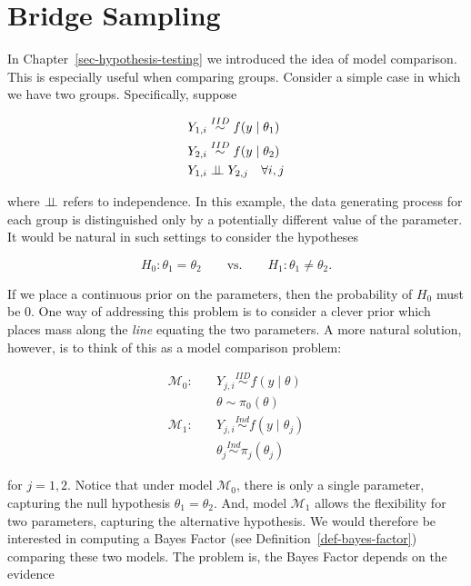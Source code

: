 \documentclass[
  letterpaper,
  DIV=11,
  numbers=noendperiod]{scrreprt}
\theoremstyle{definition}
\theoremstyle{definition}
\theoremstyle{plain}
\theoremstyle{remark}
\begin{document}
\hypertarget{bridge-sampling}{%
\section{Bridge Sampling}\label{bridge-sampling}}

In Chapter~\ref{sec-hypothesis-testing} we introduced the idea of model
comparison. This is especially useful when comparing groups. Consider a
simple case in which we have two groups. Specifically, suppose

\[
\begin{aligned}
  Y_{1,i} &\stackrel{IID}{\sim} f(y \mid \theta_1) \\
  Y_{2,i} &\stackrel{IID}{\sim} f(y \mid \theta_2) \\
  Y_{1,i} &\perp\negthickspace\negmedspace\perp Y_{2,j} \quad \forall i, j
\end{aligned}
\]

where \(\perp\negthickspace\negmedspace\perp\) refers to independence.
In this example, the data generating process for each group is
distinguished only by a potentially different value of the parameter. It
would be natural in such settings to consider the hypotheses

\[H_0: \theta_1 = \theta_2 \qquad \text{vs.} \qquad H_1: \theta_1 \neq \theta_2.\]

If we place a continuous prior on the parameters, then the probability
of \(H_0\) must be 0. One way of addressing this problem is to consider
a clever prior which places mass along the \emph{line} equating the two
parameters. A more natural solution, however, is to think of this as a
model comparison problem:

\[
\begin{aligned}
  \mathcal{M}_0:& \quad Y_{j, i} \stackrel{IID}{\sim} f(y \mid \theta) \\
    & \quad \theta \sim \pi_0(\theta) \\
  \mathcal{M}_1:& \quad Y_{j, i} \stackrel{Ind}{\sim} f(y \mid \theta_j) \\
    & \quad \theta_j \stackrel{Ind}{\sim} \pi_j(\theta_j)
\end{aligned}
\]

for \(j = 1, 2\). Notice that under model \(\mathcal{M}_0\), there is
only a single parameter, capturing the null hypothesis
\(\theta_1 = \theta_2\). And, model \(\mathcal{M}_1\) allows the
flexibility for two parameters, capturing the alternative hypothesis. We
would therefore be interested in computing a Bayes Factor (see
Definition~\ref{def-bayes-factor}) comparing these two models. The
problem is, the Bayes Factor depends on the evidence
\end{document}
